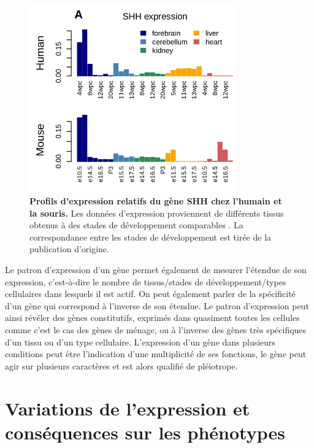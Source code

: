 \begin{figure}[h]
    \centering
    \includegraphics[width=0.8\textwidth, page=1] {figures/introduction/fig2.png}
    \caption[Profils d'expression relatifs du gène \acrshort{SHH} chez l'humain et la souris.]{
    \textbf{Profils d'expression relatifs du gène \acrshort{SHH} chez l'humain et la souris.}
    Les données d'expression proviennent de différents tissus obtenus à des stades de développement comparables \citep{cardoso-moreira_gene_2019}. La correspondance entre les stades de développement est tirée de la publication d'origine.\\
    }
    \label{fig:Fig2}
\end{figure} 

Le patron d’expression d’un gène permet également de mesurer l’étendue de son expression, c’est-à-dire le nombre de tissus/stades de développement/types cellulaires dans lesquels il est actif. On peut également parler de la spécificité d’un gène qui correspond à l’inverse de son étendue. Le patron d’expression peut ainsi révéler des gènes constitutifs, exprimés dans quasiment toutes les cellules comme c’est le cas des gènes de ménage, ou à l’inverse des gènes très spécifiques d’un tissu ou d'un type cellulaire. L’expression d’un gène dans plusieurs conditions peut être l’indication d’une multiplicité de ses fonctions, le gène peut agir sur plusieurs caractères et est alors qualifié de pléiotrope.

\section{Variations de l’expression et conséquences sur les phénotypes}
\label{sec:variations-et-consequence}

